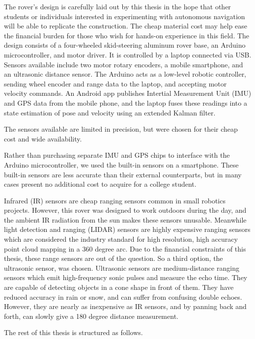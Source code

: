 The rover's design is carefully laid out by this thesis in the hope that other students or individuals interested in experimenting with autonomous navigation will be able to replicate the construction. The cheap material cost may help ease the financial burden for those who wish for hands-on experience in this field. The design consists of a four-wheeled skid-steering aluminum rover base, an Arduino microcontroller, and motor driver. It is controlled by a laptop connected via USB. Sensors available include two motor rotary encoders, a mobile smartphone, and an ultrasonic distance sensor. The Arduino acts as a low-level robotic controller, sending wheel encoder and range data to the laptop, and accepting motor velocity commands. An Android app publishes Intertial Measurement Unit (IMU) and GPS data from the mobile phone, and the laptop fuses these readings into a state estimation of pose and velocity using an extended Kalman filter.

The sensors available are limited in precision, but were chosen for their cheap cost and wide availability. 

Rather than purchasing separate IMU and GPS chips to interface with the Arduino microcontroller, we used the built-in sensors on a smartphone. These built-in sensors are less accurate than their external counterparts, but in many cases present no additional cost to acquire for a college student.

Infrared (IR) sensors are cheap ranging sensors common in small robotics projects. However, this rover was designed to work outdoors during the day, and the ambient IR radiation from the sun makes these sensors unusable. Meanwhile light detection and ranging (LIDAR) sensors are highly expensive ranging sensors which are considered the industry standard for high resolution, high accuracy point cloud mapping in a 360 degree arc. Due to the financial constraints of this thesis, these range sensors are out of the question. So a third option, the ultrasonic sensor, was chosen. Ultrasonic sensors are medium-distance ranging sensors which emit high-frequency sonic pulses and measure the echo time. They are capable of detecting objects in a cone shape in front of them. They have reduced accuracy in rain or snow, and can suffer from confusing double echoes. However, they are nearly as inexpensive as IR sensors, and by panning back and forth, can slowly give a 180 degree distance measurement.

The rest of this thesis is structured as follows.

